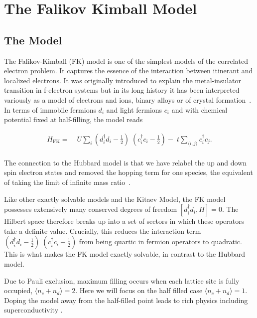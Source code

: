 \hypertarget{the-falikov-kimball-model}{%
\section{The Falikov Kimball Model}\label{the-falikov-kimball-model}}

\hypertarget{the-model}{%
\subsection{The Model}\label{the-model}}

The Falikov-Kimball (FK) model is one of the simplest models of the correlated electron problem. It captures the essence of the interaction between itinerant and localized electrons. It was originally introduced to explain the metal-insulator transition in f-electron systems but in its long history it has been interpreted variously as a model of electrons and ions, binary alloys or of crystal formation~\autocite{hubbardj.ElectronCorrelationsNarrow1963,falicovSimpleModelSemiconductorMetal1969,gruberFalicovKimballModelReview1996,gruberFalicovKimballModel2006}. In terms of immobile fermions \(d_i\) and light fermions \(c_i\) and with chemical potential fixed at half-filling, the model reads

\[\begin{aligned}
H_{\mathrm{FK}} = & \;U \sum_{i} (d^\dagger_{i}d_{i} - \tfrac{1}{2})\;(c^\dagger_{i}c_{i} - \tfrac{1}{2}) -\;t \sum_{\langle i,j\rangle} c^\dagger_{i}c_{j}.\\ 
\end{aligned}\]

The connection to the Hubbard model is that we have relabel the up and down spin electron states and removed the hopping term for one species, the equivalent of taking the limit of infinite mass ratio~\autocite{devriesSimplifiedHubbardModel1993}.

Like other exactly solvable models \autocite{smithDisorderFreeLocalization2017} and the Kitaev Model, the FK model possesses extensively many conserved degrees of freedom \([d^\dagger_{i}d_{i}, H] = 0\). The Hilbert space therefore breaks up into a set of sectors in which these operators take a definite value. Crucially, this reduces the interaction term \((d^\dagger_{i}d_{i} - \tfrac{1}{2})\;(c^\dagger_{i}c_{i} - \tfrac{1}{2})\) from being quartic in fermion operators to quadratic. This is what makes the FK model exactly solvable, in contrast to the Hubbard model.

Due to Pauli exclusion, maximum filling occurs when each lattice site is fully occupied, \(\langle n_c + n_d \rangle = 2\). Here we will focus on the half filled case \(\langle n_c + n_d \rangle = 1\). Doping the model away from the half-filled point leads to rich physics including superconductivity \autocite{jedrzejewskiFalicovKimballModels2001}.

